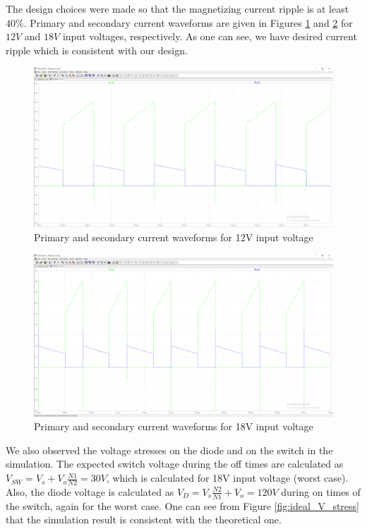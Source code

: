 \documentclass[12pt]{article}
\begin{document}
    The design choices were made so that the magnetizing current ripple is at least $40\%$. Primary and secondary current waveforms are given in Figures \ref{fig:ideal_Lm_ripples_12V} and \ref{fig:ideal_Lm_ripples_18V} for $12V$ and $18V$ input voltages, respectively. As one can see, we have desired current ripple which is consistent with our design. \\

    \begin{figure}[H]
        \centering
        \includegraphics[scale=0.3]{img/Spice_Sim/Ideal/ideal_Lm_ripples_12V.PNG}
        \caption{Primary and secondary current waveforms for 12V input voltage}
        \label{fig:ideal_Lm_ripples_12V}
    \end{figure}

    \begin{figure}[H]
        \centering
        \includegraphics[scale=0.3]{img/Spice_Sim/Ideal/ideal_Lm_ripples_18V.PNG}
        \caption{Primary and secondary current waveforms for 18V input voltage}
        \label{fig:ideal_Lm_ripples_18V}
    \end{figure}

    We also observed the voltage stresses on the diode and on the switch in the simulation. The expected switch voltage during the off times are calculated as $V_{SW} = V_s + V_o\frac{N1}{N2} = 30V$, which is calculated for 18V input voltage (worst case). Also, the diode voltage is calculated as $V_D = V_s\frac{N2}{N1}+V_o = 120V$ during on times of the switch, again for the worst case. One can see from Figure \ref{fig:ideal_V_stress} that the simulation result is consistent with the theoretical one. \\
\end{document}
